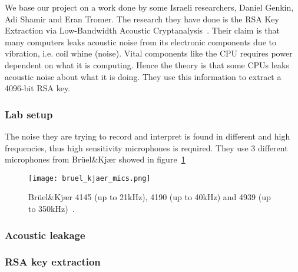 We base our project on a work done by some Israeli researchers, Daniel Genkin, Adi Shamir and Eran Tromer.
The research they have done is the RSA Key Extraction via Low-Bandwidth Acoustic Cryptanalysis~\cite{DBLP:conf/crypto/GenkinST14}.
Their claim is that many computers leaks acoustic noise from its electronic components due to vibration, i.e. coil whine (noise).
Vital components like the CPU requires power dependent on what it is computing.
Hence the theory is that some CPUs leaks acoustic noise about what it is doing.
They use this information to extract a 4096-bit RSA key.

\subsubsection*{Lab setup}\label{chp2:subsubsec:lab_setup}

The noise they are trying to record and interpret is found in different and high frequencies, thus high sensitivity microphones is required. 
They use 3 different microphones from Brüel\&Kjær showed in figure~\ref{fig:bruel_kjaer_mics}

\begin{figure}[h]
	\centering
    \texttt{[image: bruel\_kjaer\_mics.png]}
    \caption{Brüel\&Kjær 4145 (up to 21kHz), 4190 (up to 40kHz) and 4939 (up to 350kHz)~\cite{DBLP:conf/crypto/GenkinST14}.}
    \label{fig:bruel_kjaer_mics}
\end{figure}


\subsubsection*{Acoustic leakage}\label{chp2:subsubsec:acustic_leakage}


\subsubsection*{RSA key extraction}\label{chp2:subsubsec:rsa_key_extraction}

